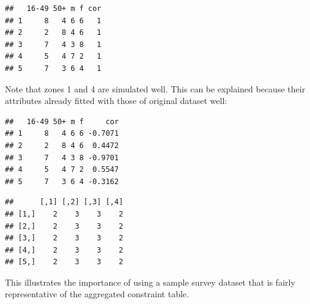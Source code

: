 \begin{Shaded}
\begin{Highlighting}[]
\NormalTok{:}
    \NormalTok{(}\NormalTok{(}\NormalTok{(all.msim[i, }\NormalTok{:}\NormalTok{])), USd.agg2[i, }
        \NormalTok{])}
\NormalTok{\}}
\end{Highlighting}
\end{Shaded}
\begin{verbatim}
##   16-49 50+ m f cor
## 1     8   4 6 6   1
## 2     2   8 4 6   1
## 3     7   4 3 8   1
## 4     5   4 7 2   1
## 5     7   3 6 4   1
\end{verbatim}
Note that zones 1 and 4 are simulated well. This can be explained
because their attributes already fitted with those of original dataset
well:

\begin{Shaded}
\begin{Highlighting}[]
\NormalTok{:}
    \NormalTok{(}\NormalTok{(}\NormalTok{(all.msim[i, }\NormalTok{:}\NormalTok{])), USd.agg}\NormalTok{[i, }
        \NormalTok{])}
\NormalTok{\}}
\end{Highlighting}
\end{Shaded}
\begin{verbatim}
##   16-49 50+ m f     cor
## 1     8   4 6 6 -0.7071
## 2     2   8 4 6  0.4472
## 3     7   4 3 8 -0.9701
## 4     5   4 7 2  0.5547
## 5     7   3 6 4 -0.3162
\end{verbatim}
\begin{Shaded}
\begin{Highlighting}[]
\end{Highlighting}
\end{Shaded}
\begin{verbatim}
##      [,1] [,2] [,3] [,4]
## [1,]    2    3    3    2
## [2,]    2    3    3    2
## [3,]    2    3    3    2
## [4,]    2    3    3    2
## [5,]    2    3    3    2
\end{verbatim}
This illustrates the importance of using a sample survey dataset that is
fairly representative of the aggregated constraint table.

